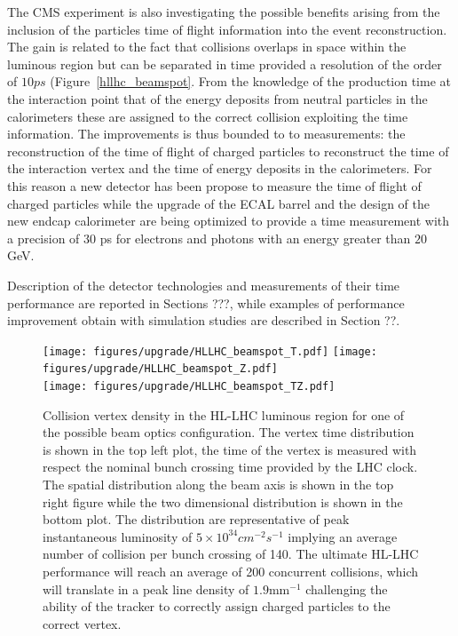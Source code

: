 The CMS experiment is also investigating the possible benefits arising from the inclusion of the particles
time of flight information into the event reconstruction. The gain is related to the fact that
collisions overlaps in space within the luminous region but can be separated in time provided a resolution of the
order of $10 ps$ (Figure~\ref{hllhc_beamspot}.
From the knowledge of the production time at the interaction point that of the energy deposits from neutral
particles in the calorimeters these are assigned to the correct collision exploiting the time information.
The improvements is thus bounded to
to measurements: the reconstruction of the time of flight of charged particles to reconstruct the time
of the interaction vertex and the time of energy deposits in the calorimeters. For this reason a new detector
has been propose to measure the time of flight of charged particles while the upgrade of the ECAL barrel and
the design of the new endcap calorimeter are being optimized to provide a time measurement with a precision
of $30$ ps for electrons and photons with an energy greater than $20$ GeV.

Description of the detector technologies and measurements of their time performance are reported in Sections ???,
while examples of performance improvement obtain with simulation studies are described in Section ??.

\begin{figure}[h!]
  \centering
  \texttt{[image: figures/upgrade/HLLHC\_beamspot\_T.pdf]}
  \texttt{[image: figures/upgrade/HLLHC\_beamspot\_Z.pdf]} \\
  \texttt{[image: figures/upgrade/HLLHC\_beamspot\_TZ.pdf]}
  \caption{Collision vertex density in the HL-LHC luminous region for one of the possible beam optics configuration.
    The vertex time distribution is shown in the top left plot, the time of the vertex is measured with respect
    the nominal bunch crossing time provided by the LHC clock. The spatial distribution along the beam axis is shown in
    the top right figure while the two dimensional distribution is shown in the bottom plot.
    The distribution are representative of peak instantaneous luminosity of $5\times10^{34} cm^{-2}s^{-1}$ implying
    an average number of collision per bunch crossing of 140. The ultimate HL-LHC performance will reach an average of 200
    concurrent collisions, which will translate in a peak line density of $1.9$mm$^{-1}$ challenging the ability
    of the tracker to correctly assign charged particles to the correct vertex.}
  \label{fig:hllhc_beamspot}
\end{figure}


